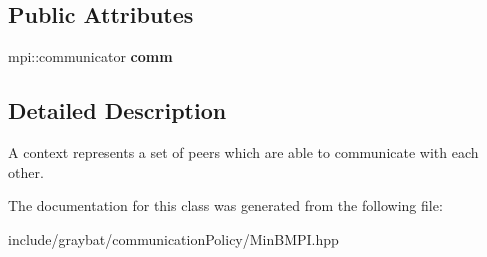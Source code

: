 \subsection*{Public Attributes}
\begin{DoxyCompactItemize}
\item 
\hypertarget{classgraybat_1_1communicationPolicy_1_1MinBMPI_1_1Context_afa06341f7a8701498284a3212165e146}{}mpi\+::communicator {\bfseries comm}\label{classgraybat_1_1communicationPolicy_1_1MinBMPI_1_1Context_afa06341f7a8701498284a3212165e146}

\end{DoxyCompactItemize}


\subsection{Detailed Description}
A context represents a set of peers which are able to communicate with each other. 

The documentation for this class was generated from the following file\+:\begin{DoxyCompactItemize}
\item 
include/graybat/communication\+Policy/Min\+B\+M\+P\+I.\+hpp\end{DoxyCompactItemize}
